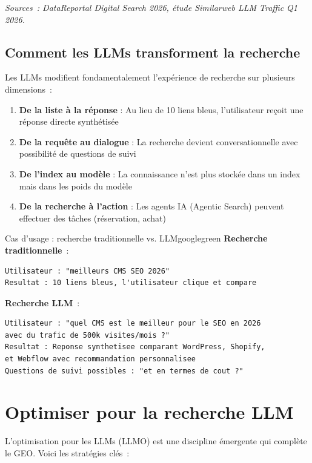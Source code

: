 \documentclass[12pt,a4paper,twoside]{report}
\begin{document}
\textit{Sources~: DataReportal Digital Search 2026, étude Similarweb LLM Traffic Q1 2026.}

\subsection{Comment les LLMs transforment la recherche}

Les LLMs modifient fondamentalement l'expérience de recherche sur plusieurs dimensions~:

\begin{enumerate}
    \item \textbf{De la liste à la réponse} : Au lieu de 10 liens bleus, l'utilisateur reçoit une réponse directe synthétisée
    \item \textbf{De la requête au dialogue} : La recherche devient conversationnelle avec possibilité de questions de suivi
    \item \textbf{De l'index au modèle} : La connaissance n'est plus stockée dans un index mais dans les poids du modèle
    \item \textbf{De la recherche à l'action} : Les agents IA (Agentic Search) peuvent effectuer des tâches (réservation, achat)
\end{enumerate}

\begin{mybox}{Cas d'usage : recherche traditionnelle vs. LLM}{googlegreen}
\textbf{Recherche traditionnelle}~:
\begin{verbatim}
Utilisateur : "meilleurs CMS SEO 2026"
Resultat : 10 liens bleus, l'utilisateur clique et compare
\end{verbatim}

\textbf{Recherche LLM}~:
\begin{verbatim}
Utilisateur : "quel CMS est le meilleur pour le SEO en 2026 
avec du trafic de 500k visites/mois ?"
Resultat : Reponse synthetisee comparant WordPress, Shopify, 
et Webflow avec recommandation personnalisee
Questions de suivi possibles : "et en termes de cout ?"
\end{verbatim}
\end{mybox}

\section{Optimiser pour la recherche LLM}

L'optimisation pour les LLMs (LLMO) est une discipline émergente qui complète le GEO. Voici les stratégies clés~:
\end{document}
